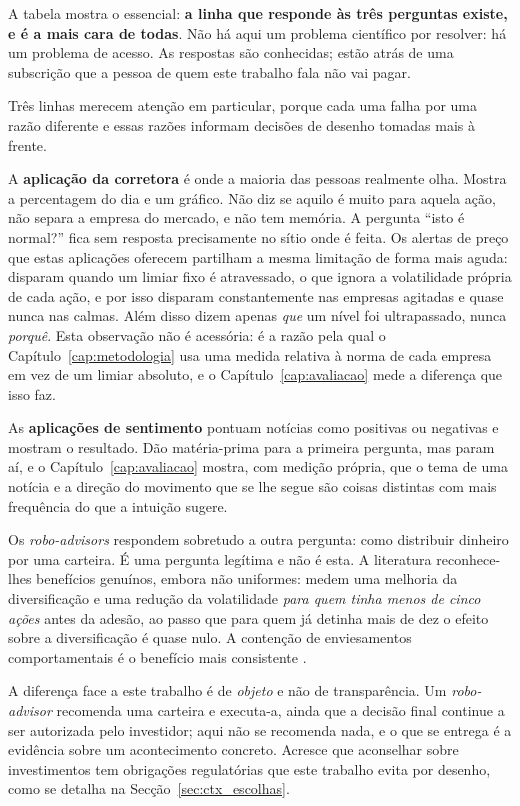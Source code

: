A tabela mostra o essencial: \textbf{a linha que responde às três perguntas existe, e é a mais cara
de todas}. Não há aqui um problema científico por resolver: há um problema de acesso. As
respostas são conhecidas; estão atrás de uma subscrição que a pessoa de quem este trabalho fala não
vai pagar.

Três linhas merecem atenção em particular, porque cada uma falha por uma razão diferente e essas
razões informam decisões de desenho tomadas mais à frente.

A \textbf{aplicação da corretora} é onde a maioria das pessoas realmente olha. Mostra a percentagem do dia
e um gráfico. Não diz se aquilo é muito para aquela ação, não separa a empresa do mercado, e não tem
memória. A pergunta ``isto é normal?'' fica sem resposta precisamente no sítio onde é feita. Os
alertas de preço que estas aplicações oferecem partilham a mesma limitação de forma mais aguda:
disparam quando um limiar fixo é atravessado, o que ignora a volatilidade própria de cada ação, e
por isso disparam constantemente nas empresas agitadas e quase nunca nas calmas. Além disso dizem
apenas \emph{que} um nível foi ultrapassado, nunca \emph{porquê}. Esta observação não é acessória: é
a razão pela qual o Capítulo~\ref{cap:metodologia} usa uma medida relativa à norma de cada empresa em
vez de um limiar absoluto, e o Capítulo~\ref{cap:avaliacao} mede a diferença que isso faz.

As \textbf{aplicações de sentimento} pontuam notícias como positivas ou negativas e mostram o resultado.
Dão matéria-prima para a primeira pergunta, mas param aí, e o Capítulo~\ref{cap:avaliacao} mostra,
com medição própria, que o tema de uma notícia e a direção do movimento que se lhe segue são coisas
distintas com mais frequência do que a intuição sugere.

Os \emph{robo-advisors} \autocite{dacunto2019robo} respondem sobretudo a outra pergunta: como
distribuir dinheiro por uma carteira. É uma pergunta legítima e não é esta. A literatura
reconhece-lhes benefícios genuínos, embora não uniformes: \textcite{dacunto2019robo} medem uma
melhoria da diversificação e uma redução da volatilidade \emph{para quem tinha menos de cinco ações}
antes da adesão, ao passo que para quem já detinha mais de dez o efeito sobre a diversificação é
quase nulo. A contenção de enviesamentos comportamentais é o benefício mais consistente
\autocite{dacunto2019robo, cardillo2024robo}.

A diferença face a este trabalho é de \emph{objeto} e não de transparência. Um \emph{robo-advisor}
recomenda uma carteira e executa-a, ainda que a decisão final continue a ser autorizada pelo
investidor; aqui não se recomenda nada, e o que se entrega é a evidência sobre um acontecimento
concreto. Acresce que aconselhar sobre investimentos tem obrigações regulatórias que este trabalho
evita por desenho, como se detalha na Secção~\ref{sec:ctx_escolhas}.

